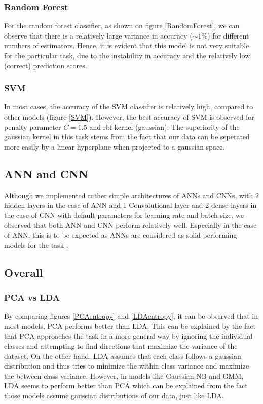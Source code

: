 \documentclass[10pt,journal,compsoc]{IEEEtran}
\begin{document}
\subsubsection{Random Forest}
For the random forest classifier, as shown on figure \ref{RandomForest},
we can observe that there is a relatively large
variance in accuracy ($\sim1\%$) for different
numbers of estimators.
Hence, it is evident that this model is not
very suitable for the particular task, due
to the instability in accuracy and the relatively
low (correct) prediction scores.

\subsubsection{SVM}
In most cases, the accuracy of the SVM classifier
is relatively high, compared to other models (figure \ref{SVM}).
However, the best accuracy of SVM is observed 
for penalty parameter $C=1.5$ and rbf 
kernel (gaussian).
The superiority of the gaussian kernel in this
task stems from the fact that our data can
be seperated more easily by a linear hyperplane when 
projected to a gaussian space\cite{a3}.

\subsection{ANN and CNN}
Although we implemented rather simple architectures
of ANNs and CNNs, with 2 hidden layers in the case
of ANN and 1 Convolutional layer and 2 dense layers
in the case of CNN with default parameters for
learning rate and batch size, we observed that
both ANN and CNN perform relatively well.
Especially in the case of ANN, this is to be
expected as ANNs are considered as solid-performing
models for the task \cite{a4}.

\subsection{Overall}
\subsubsection{PCA vs LDA}
By comparing figures \ref{PCAentropy} and \ref{LDAentropy},
it can be observed that in most models, PCA performs
better than LDA.
This can be explained by the fact that PCA approaches the
task in a more general way by ignoring the individual classes
and attempting to find directions that maximize the variance of
the dataset.
On the other hand, LDA assumes that each class follows a 
gaussian distribution and thus tries to minimize the
within class variance and maximize the between-class
variance.
However, in models like Gaussian NB and GMM, LDA seems to
perform better than PCA which can be explained from the fact
those models assume gaussian distributions of our data,
just like LDA.
\end{document}
